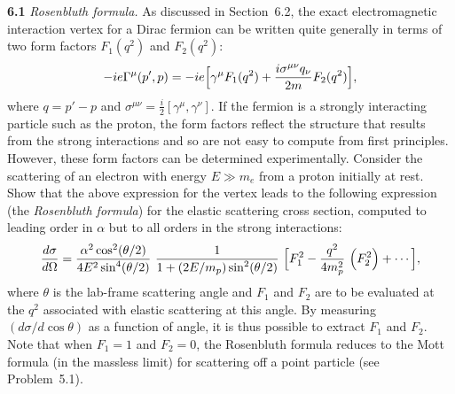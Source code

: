 \textbf{6.1} \emph{Rosenbluth formula.}  As discussed in Section~6.2, the
exact electromagnetic interaction vertex for a Dirac fermion can be written
quite generally in terms of two form factors $F_1(q^2)$ and $F_2(q^2)$:
\begin{equation}
  -ie\Gamma^\mu(p',p) = -ie\Bigl[ \gamma^\mu F_1(q^2)
    + \frac{i\sigma^{\mu\nu}q_\nu}{2m}F_2(q^2) \Bigr],
\end{equation}
where $q = p'-p$ and $\sigma^{\mu\nu} = \tfrac{i}{2}[\gamma^\mu, \gamma^\nu]$.
If the fermion is a strongly interacting particle such as the proton, the form
factors reflect the structure that results from the strong interactions and so
are not easy to compute from first principles.  However, these form factors
can be determined experimentally.  Consider the scattering of an electron with
energy $E \gg m_e$ from a proton initially at rest.  Show that the above
expression for the vertex leads to the following expression (the
\emph{Rosenbluth formula}) for the elastic scattering cross section, computed
to leading order in $\alpha$ but to all orders in the strong interactions:
\begin{equation}
  \frac{d\sigma}{d\Omega} = \frac{\alpha^2\cos^2(\theta/2)}
    {4E^2\sin^4(\theta/2)}\ \frac{1}{1 + (2E/m_p)\sin^2(\theta/2)}\
    \Bigl[ F_1^2 - \frac{q^2}{4m_p^2}\ \Bigl( F_2^2 \Bigr)
      + \cdots \Bigr],
\end{equation}
where $\theta$ is the lab-frame scattering angle and $F_1$ and $F_2$ are to be
evaluated at the $q^2$ associated with elastic scattering at this angle.  By
measuring $(d\sigma/d\cos\theta)$ as a function of angle, it is thus possible
to extract $F_1$ and $F_2$.  Note that when $F_1 = 1$ and $F_2 = 0$, the
Rosenbluth formula reduces to the Mott formula (in the massless limit) for
scattering off a point particle (see Problem~5.1).

